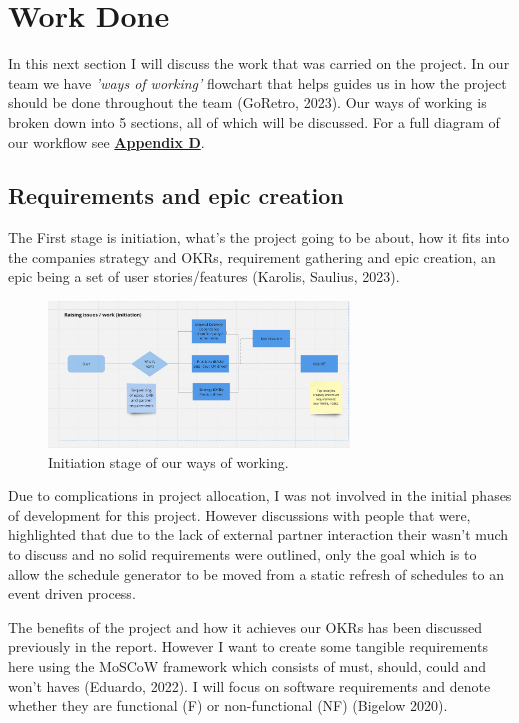 \section{Work Done}
  In this next section I will discuss the work that was carried on the project. In our team we have \textit{'ways of working'}
  flowchart that helps guides us in how the project should be done throughout the team (GoRetro, 2023). Our ways of working is broken down into 5 sections, 
  all of which will be discussed. For a full diagram of our workflow see \hyperref[sec:AppendixD]{\textbf{Appendix D}}.

  \subsection{Requirements and epic creation}
  The First stage is initiation, what's the project going to be about, how it fits into the companies strategy and OKRs, requirement gathering 
  and epic creation, an epic being a set of user stories/features (Karolis, Saulius, 2023).

  \begin{figure}[H]
    \centering
    \includegraphics[width=8cm]{assets/workflow/initiate.png}
    \caption{Initiation stage of our ways of working.}
    \label{fig:workflowInitiate}
  \end{figure}

  Due to complications in project allocation, I was not involved in the initial phases of development for this project. However discussions with 
  people that were, highlighted that due to the lack of external partner interaction their wasn't much to discuss and no solid requirements were 
  outlined, only the goal which is to allow the schedule generator to be moved from a static refresh of schedules to an event driven process.

  The benefits of the project and how it achieves our OKRs has been discussed previously in the report. However I want to create some tangible
  requirements here using the MoSCoW framework which consists of must, should, could and won't haves (Eduardo, 2022). I will focus on software
  requirements and denote whether they are functional (F) or non-functional (NF) (Bigelow 2020).

